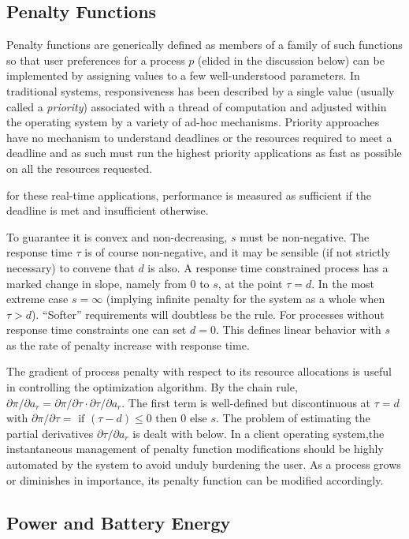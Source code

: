 \subsection*{Penalty Functions}

Penalty functions  are generically defined as members of a family of such functions
so that user preferences for a process $p$ (elided in the discussion below)
can be implemented by assigning values to a few well-understood parameters.
In traditional systems, responsiveness has been described by a single value (usually called a \emph{priority}) associated with a thread of computation and adjusted within the operating system by a variety of ad-hoc mechanisms.   Priority approaches have no mechanism to understand deadlines or the resources required to meet a deadline and as such must run the highest priority applications as fast as possible on all the resources requested. 

for these real-time applications, performance is measured as sufficient if the deadline is met and insufficient otherwise.

To guarantee it is convex and non-decreasing, $s$ must be non-negative.
The response time $\tau$  is of course non-negative,
and it may be sensible (if not strictly necessary) to convene that $d$ is also.
A response time constrained process has a marked change in slope, namely from 0 to $s$, at the point $\tau= d$.
In the most extreme case $s = \infty$ (implying infinite penalty for the system as a whole when $\tau > d$).  ``Softer'' requirements will doubtless be the rule.
For processes without response time constraints one can set $d = 0$.
This defines linear behavior with $s$ as the rate of penalty increase with response time.

The gradient of process penalty with respect to its resource allocations is useful in controlling the optimization algorithm.
By the chain rule, $\partial\pi/\partial a_r = \partial\pi/\partial\tau\cdot\partial\tau/\partial a_r$.
The first term is well-defined but discontinuous at $\tau = d$ with
$\partial\pi/\partial\tau = \mbox{ if } (\tau - d) \leq 0 \mbox{ then } 0 \mbox{ else } s$.
The problem of estimating the partial derivatives $\partial\tau/\partial a_r$ is dealt with below.
In a client operating system,the instantaneous management of penalty function modifications
should be highly automated by the system to avoid unduly burdening the user.
As a process grows or diminishes in importance, its penalty function can be modified accordingly.

\subsection*{Power and Battery Energy}

